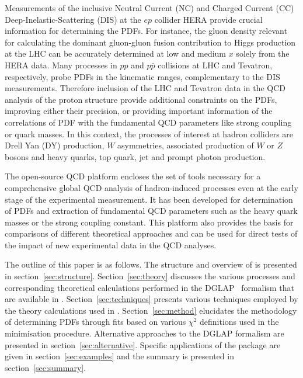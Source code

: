 Measurements of the inclusive Neutral Current (NC) and Charged Current (CC)  
Deep-Inelastic-Scattering (DIS) at the $ep$ collider HERA provide crucial information for determining the PDFs.
%
For instance, the gluon density relevant
for calculating the dominant gluon-gluon fusion contribution to Higgs production
at the LHC can be accurately determined at low and medium $x$ solely from the HERA data.
%
Many processes in $pp$ and $p \bar p$ collisions at LHC and Tevatron, respectively, 
probe PDFs in the kinematic ranges, complementary to the DIS measurements. 
Therefore inclusion of the LHC and Tevatron data in the QCD analysis of the proton structure 
provide additional constraints on the PDFs, improving either their precision, 
or providing important information of the correlations of PDF with the fundamental 
QCD parameters like strong coupling or quark masses. 
%
%
In this context, the processes of interest at hadron colliders are
Drell Yan (DY) production, $W$ asymmetries, associated production of $W$ or $Z$ bosons 
and heavy quarks, top quark, jet and prompt photon production.
%

%
The open-source QCD platform \fitter encloses the set of tools  necessary for a comprehensive global 
QCD analysis of hadron-induced processes even at the early stage of the experimental measurement. 
It has been developed for determination of PDFs and extraction of fundamental QCD parameters such as the heavy
quark masses or the strong coupling constant. This platform also provides the basis for 
comparisons of different theoretical approaches and can be used for direct tests of the impact 
of new experimental data in the QCD analyses.

The outline of this paper is as follows.
%
The structure and overview of \fitter is presented in section~\ref{sec:structure}.
Section~\ref{sec:theory} discusses the various processes 
and corresponding theoretical calculations performed in the DGLAP~\cite{Gribov:1972ri,Gribov:1972rt,Lipatov:1974qm,
Dokshitzer:1977sg,Altarelli:1977zs} formalism that are available in \fitter.
%
Section~\ref{sec:techniques} presents various techniques employed by the theory calculations used in \fitter.
Section~\ref{sec:method} elucidates the 
methodology of determining PDFs through fits based on various
 $\chi^2$ definitions used in the
minimisation procedure. 
Alternative approaches to the DGLAP formalism are presented in section~\ref{sec:alternative}.
%
Specific applications of the package are given in
section~\ref{sec:examples} and the summary is presented in section~\ref{sec:summary}.
%
